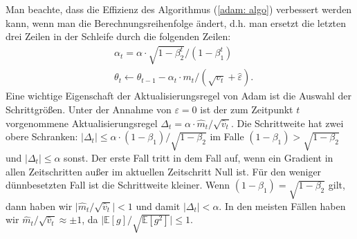 \documentclass[12pt,titlepage,headsepline]{article}
\begin{document}
      \hfill\break
      Man beachte, dass die Effizienz des Algorithmus (\ref{adam: algo}) verbessert werden kann, wenn man die Berechnungsreihenfolge ändert, d.h. man ersetzt die letzten drei Zeilen in der Schleife durch die folgenden Zeilen:
      \begin{align*}
        & \alpha_t = \alpha \cdot \sqrt{1-\beta_2^t}/(1-\beta_1^t) \\
        & \theta_t \leftarrow \theta_{t-1} - \alpha_t \cdot m_t / (\sqrt{v_t}+\hat \varepsilon).
      \end{align*}
      Eine wichtige Eigenschaft der Aktualisierungsregel von Adam ist die Auswahl der Schrittgrößen. Unter der Annahme von $\varepsilon = 0$ ist der zum Zeitpunkt $t$ vorgenommene Aktualisierungsregel $\Delta_t = \alpha \cdot \hat m_t / \sqrt{\hat v_t}$. Die Schrittweite hat zwei obere Schranken: $\lvert \Delta_t \rvert \leq \alpha \cdot (1-\beta_1) / \sqrt{1-\beta_2}$ im Falle $(1-\beta_1) > \sqrt{1-\beta_2}$ und $\lvert \Delta_t \rvert \leq \alpha$
      sonst. Der erste Fall tritt in dem Fall auf, wenn ein Gradient in allen Zeitschritten außer im aktuellen Zeitschritt Null ist. Für den weniger dünnbesetzten Fall ist die Schrittweite kleiner. Wenn $(1-\beta_1) = \sqrt{1-\beta_2}$ gilt, dann haben wir $\lvert \hat m_t / \sqrt{\hat v_t} \rvert < 1$ und damit $\lvert \Delta_t \rvert < \alpha$. In den meisten Fällen haben wir $\hat m_t / \sqrt{\hat v_t} \approx \pm 1$, da $\lvert \mathbb{E}[g]/ \sqrt{\mathbb{E}[g^2]} \rvert \leq 1$.
\end{document}
